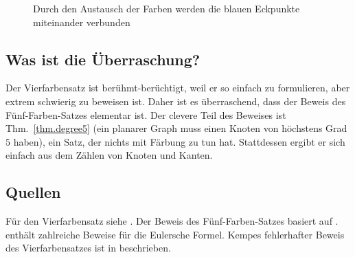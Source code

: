 \begin{figure}[ht]
\begin{minipage}{.50\textwidth}
\begin{center}
\caption{Durch den Austausch der Farben werden die blauen Eckpunkte miteinander verbunden}\label{f.five-kempe2-share}
\end{center}
\end{minipage}
\end{figure}

\subsection*{Was ist die Überraschung?}

Der Vierfarbensatz ist berühmt-berüchtigt, weil er so einfach zu formulieren, aber extrem schwierig zu beweisen ist. Daher ist es überraschend, dass der Beweis des Fünf-Farben-Satzes elementar ist. Der clevere Teil des Beweises ist Thm.~\ref{thm.degree5} (ein planarer Graph muss einen Knoten von höchstens Grad $5$ haben), ein Satz, der nichts mit Färbung zu tun hat. Stattdessen ergibt er sich einfach aus dem Zählen von Knoten und Kanten.

\subsection*{Quellen}
Für den Vierfarbensatz siehe \cite{thomas,wiki:four}. Der Beweis des Fünf-Farben-Satzes basiert auf \cite{thebook,wiki:five}.
\cite{eppstein} enthält zahlreiche Beweise für die Eulersche Formel. Kempes fehlerhafter Beweis des Vierfarbensatzes ist in \cite{sipka} beschrieben.
